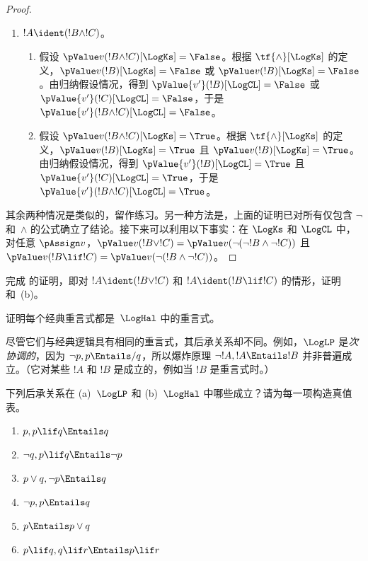 \documentclass[../../../include/open-logic-section]{subfiles}
\begin{document}
\begin{proof}
\begin{enumerate}
    \item $!A \ident (!B \land !C)$。
    \begin{enumerate}
      \item 假设 $\pValue v(!B \land !C)[\LogKs] = \False$。根据
      $\tf{\land}[\LogKs]$ 的定义，$\pValue v(!B)[\LogKs]  =
      \False$ 或 $\pValue v(!B)[\LogKs]  = \False$。由归纳假设情况，得到 $\pValue {v'}(!B)[\LogCL]  = \False$ 或 $\pValue {v'}(!C)[\LogCL]  = \False$，于是 $\pValue {v'}(!B \land
      !C)[\LogCL] = \False$。
      \item 假设 $\pValue v(!B \land !C)[\LogKs] = \True$。根据
      $\tf{\land}[\LogKs]$ 的定义，$\pValue v(!B)[\LogKs]  =
      \True$ 且 $\pValue v(!B)[\LogKs]  = \True$。由归纳假设情况，得到 $\pValue {v'}(!B)[\LogCL]  = \True$ 且 $\pValue {v'}(!C)[\LogCL]  = \True$，于是 $\pValue {v'}(!B \land
      !C)[\LogCL] = \True$。
    \end{enumerate}
  \end{enumerate}

  其余两种情况是类似的，留作练习。另一种方法是，上面的证明已对所有仅包含 $\lnot$ 和~$\land$ 的公式确立了结论。接下来可以利用以下事实：在 $\LogKs$ 和 $\LogCL$ 中，对任意 $\pAssign v$，$\pValue v(!B \lor
  !C) = \pValue v(\lnot(\lnot!B \land \lnot !C))$ 且 $\pValue v(!B \lif
  !C) = \pValue v(\lnot(!B \land \lnot !C))$。
\end{proof}

\begin{prob}
  完成  的证明，即对 $!A \ident (!B \lor !C)$ 和 $!A \ident (!B \lif !C)$ 的情形，证明 和~(b)。
\end{prob}

\begin{prob}
  证明每个经典重言式都是~$\LogHal$ 中的重言式。
\end{prob}

尽管它们与经典逻辑具有相同的重言式，其后承关系却不同。例如，$\LogLP$ 是\emph{次协调的}，因为 $\lnot p, p \Entails/ q$，所以爆炸原理 $\lnot !A, !A \Entails !B$ 并非普遍成立。（它对某些 $!A$ 和 $!B$ 是成立的，例如当 $!B$ 是重言式时。）

\begin{prob}
  下列后承关系在 (a)~$\LogLP$ 和 (b)~$\LogHal$ 中哪些成立？请为每一项构造真值表。
  \begin{enumerate}
    \item $p, p \lif q \Entails q$
    \item $\lnot q, p \lif q \Entails \lnot p$
    \item $p \lor q, \lnot p \Entails q$
    \item $\lnot p, p \Entails q$
    \item $p \Entails p \lor q$
    \item $p \lif q, q\lif r \Entails p \lif r$
  \end{enumerate}
\end{prob}
\end{document}
